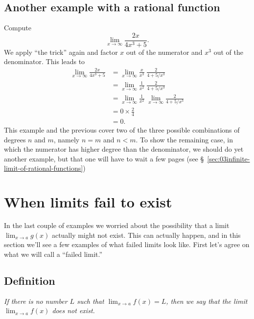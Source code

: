 \subsection{Another example with a rational function}
Compute
\[
\lim_{x\to\infty} \frac {2x}{4x^3+5}.
\]
We apply ``the trick'' again and factor $x$ out of the numerator and
$x^3$ out of the denominator.
This leads to
\begin{align*}
  \lim_{x\to\infty} \frac {2x}{4x^3+5}
  &=\lim_{x\to\infty} \frac{x}{x^3}\;\frac{2}{4+5/x^3}\\
  &=\lim_{x\to\infty} \frac{1}{x^2}\;\frac{2}{4+5/x^3}\\
  &=\lim_{x\to\infty} \frac{1}{x^2}\;\lim_{x\to\infty}\frac{2}{4+5/x^3}\\
  &=0\times \tfrac24\\
  &=0.
\end{align*} 
This example and the previous cover two of the three possible
combinations of degrees $n$ and $m$, namely $n=m$ and $n<m$.  To show
the remaining case, in which the numerator has higher degree than the
denominator, we should do yet another example, but that one will have
to wait a few pages (see
\S~\ref{sec:03infinite-limit-of-rational-functions})


\section{When limits fail to exist}
In the last couple of examples we worried about the possibility that a
limit $\lim_{x\to a}g(x)$ actually might not exist.  This can actually
happen, and in this section we'll see a few examples of what failed limits
look like.  First let's agree on what we will call a ``failed limit.''

\subsection{Definition}
\itshape
If there is no number $L$ such that $\lim_{x\to a}f(x) = L$, then we say
that the limit $\lim_{x\to a}f(x)$ does not exist.  \upshape


